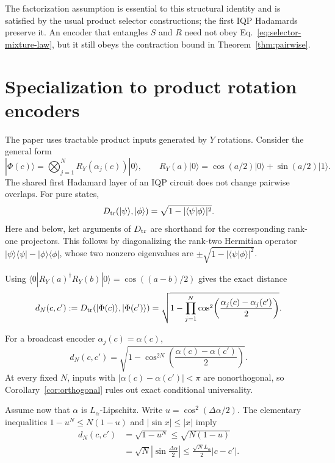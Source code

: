 \documentclass[11pt]{article}
\theoremstyle{definition}
\theoremstyle{remark}
\newcommand{\braket}[2]{\langle#1|#2\rangle}
\begin{document}
The factorization assumption is essential to this structural identity and is
satisfied by the usual product selector constructions; the first IQP
Hadamards preserve it.  An encoder that entangles $S$ and $R$ need not obey
Eq.~\eqref{eq:selector-mixture-law}, but it still obeys the contraction bound
in Theorem~\ref{thm:pairwise}.

\section{Specialization to product rotation encoders}
\label{sec:product}

The paper uses tractable product inputs generated by $Y$ rotations.  Consider
the general form
\begin{equation}
 |\Phi(c)\rangle
 =\bigotimes_{j=1}^{N}R_Y(\alpha_j(c))|0\rangle,
 \qquad
 R_Y(a)|0\rangle=\cos(a/2)|0\rangle+\sin(a/2)|1\rangle.
 \label{eq:product-encoder}
\end{equation}
The shared first Hadamard layer of an IQP circuit does not change pairwise
overlaps.  For pure states,
\begin{equation}
 D_{\rm tr}(|\psi\rangle,|\phi\rangle)
 =\sqrt{1-|\braket{\psi}{\phi}|^2}.
 \label{eq:pure-trace}
\end{equation}
Here and below, ket arguments of $D_{\rm tr}$ are shorthand for the
corresponding rank-one projectors.
This follows by diagonalizing the rank-two Hermitian operator
$|\psi\rangle\langle\psi|-|\phi\rangle\langle\phi|$, whose two nonzero
eigenvalues are
$\pm\sqrt{1-|\langle\psi|\phi\rangle|^2}$.

Using
$\langle0|R_Y(a)^\dagger R_Y(b)|0\rangle=\cos((a-b)/2)$ gives the exact
distance
\begin{equation}
 d_N(c,c')
 :=D_{\rm tr}(|\Phi(c)\rangle,|\Phi(c')\rangle)
 =\sqrt{1-\prod_{j=1}^{N}
 \cos^2\!\left(\frac{\alpha_j(c)-\alpha_j(c')}{2}\right)}.
 \label{eq:product-distance}
\end{equation}

For a broadcast encoder $\alpha_j(c)=\alpha(c)$,
\begin{equation}
 d_N(c,c')=\sqrt{1-\cos^{2N}\!\left(
 \frac{\alpha(c)-\alpha(c')}{2}\right)}.
 \label{eq:broadcast-distance}
\end{equation}
At every fixed $N$, inputs with
$|\alpha(c)-\alpha(c')|<\pi$ are nonorthogonal, so
Corollary~\ref{cor:orthogonal} rules out exact conditional universality.

Assume now that $\alpha$ is $L_\alpha$-Lipschitz.  Write
$u=\cos^2(\Delta\alpha/2)$.  The elementary inequalities
$1-u^N\leq N(1-u)$ and $|\sin x|\leq|x|$ imply
\begin{align}
 d_N(c,c')
 &=\sqrt{1-u^N}
 \leq\sqrt{N(1-u)}\\
 &=\sqrt{N}\left|\sin\frac{\Delta\alpha}{2}\right|
 \leq\frac{\sqrt{N}L_\alpha}{2}|c-c'|.
 \label{eq:broadcast-lipschitz}
\end{align}
\end{document}
